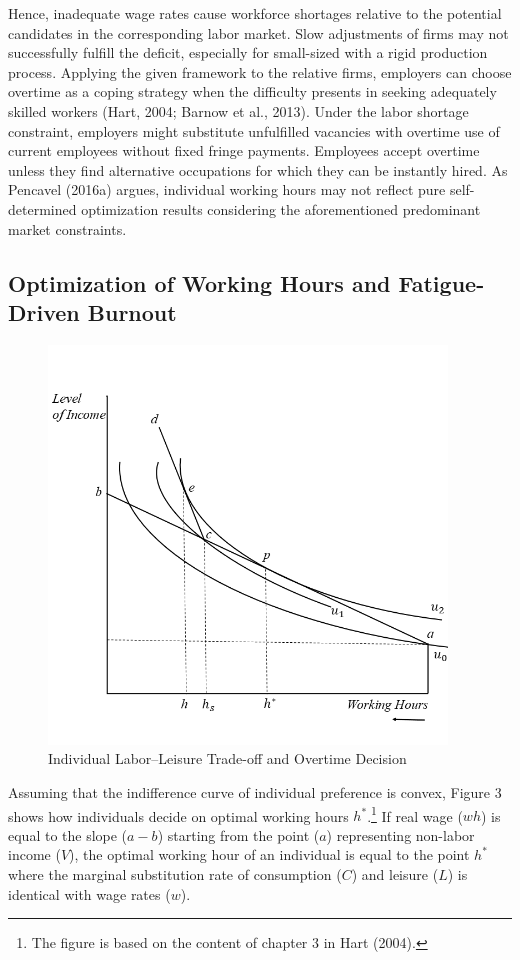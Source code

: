 \documentclass[
  12pt,
]{article}
\begin{document}
Hence, inadequate wage rates cause workforce shortages relative to the
potential candidates in the corresponding labor market. Slow adjustments
of firms may not successfully fulfill the deficit, especially for
small-sized with a rigid production process. Applying the given
framework to the relative firms, employers can choose overtime as a
coping strategy when the difficulty presents in seeking adequately
skilled workers (Hart, 2004; Barnow et al., 2013). Under the labor
shortage constraint, employers might substitute unfulfilled vacancies
with overtime use of current employees without fixed fringe payments.
Employees accept overtime unless they find alternative occupations for
which they can be instantly hired. As Pencavel (2016a) argues,
individual working hours may not reflect pure self-determined
optimization results considering the aforementioned predominant market
constraints.

\subsection{Optimization of Working Hours and Fatigue-Driven
Burnout}\label{optimization-of-working-hours-and-fatigue-driven-burnout}

\begin{figure}
\centering
\includegraphics[width=4.16667in,height=\textheight,keepaspectratio]{Individual overwork decision.png}
\caption{Individual Labor--Leisure Trade-off and Overtime Decision}
\end{figure}

Assuming that the indifference curve of individual preference is convex,
Figure 3 shows how individuals decide on optimal working hours
\(h^*\).\footnote{The figure is based on the content of chapter 3 in
  Hart (2004).} If real wage (\(wh\)) is equal to the slope (\(a-b\))
starting from the point (\(a\)) representing non-labor income (\(V\)),
the optimal working hour of an individual is equal to the point \(h^*\)
where the marginal substitution rate of consumption (\(C\)) and leisure
(\(L\)) is identical with wage rates (\(w\)).
\end{document}
